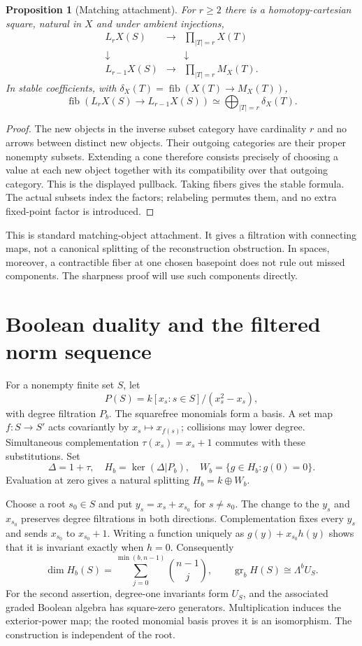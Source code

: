 \documentclass[11pt,a4paper]{article}
\newtheorem{proposition}[theorem]{Proposition}
\theoremstyle{definition}
\theoremstyle{remark}
\newcommand{\gr}{\operatorname{gr}}
\DeclareMathOperator{\fib}{fib}
\begin{document}
\begin{proposition}[Matching attachment]\label{prop:tower}
For $r\ge2$ there is a homotopy-cartesian square, natural in $X$ and under ambient injections,
\[
\begin{array}{ccc}
 L_rX(S)&\longrightarrow&\displaystyle\prod_{|T|=r}X(T)\\
 \downarrow&&\downarrow\\
 L_{r-1}X(S)&\longrightarrow&\displaystyle\prod_{|T|=r}M_X(T).
\end{array}
\]
In stable coefficients, with $\delta_X(T)=\fib(X(T)\to M_X(T))$,
\[
 \fib(L_rX(S)\to L_{r-1}X(S))\simeq\bigoplus_{|T|=r}\delta_X(T).
\]
\end{proposition}
\begin{proof}
The new objects in the inverse subset category have cardinality $r$ and no arrows between distinct new objects. Their outgoing categories are their proper nonempty subsets. Extending a cone therefore consists precisely of choosing a value at each new object together with its compatibility over that outgoing category. This is the displayed pullback. Taking fibers gives the stable formula. The actual subsets index the factors; relabeling permutes them, and no extra fixed-point factor is introduced.
\end{proof}

This is standard matching-object attachment. It gives a filtration with connecting maps, not a canonical splitting of the reconstruction obstruction. In spaces, moreover, a contractible fiber at one chosen basepoint does not rule out missed components. The sharpness proof will use such components directly.

\section{Boolean duality and the filtered norm sequence}

For a nonempty finite set $S$, let
\[
 P(S)=k[x_s:s\in S]/(x_s^2-x_s),
\]
with degree filtration $P_b$. The squarefree monomials form a basis. A set map $f:S\to S'$ acts covariantly by $x_s\mapsto x_{f(s)}$; collisions may lower degree. Simultaneous complementation $\tau(x_s)=x_s+1$ commutes with these substitutions. Set
\[
 \Delta=1+\tau,\quad H_b=\ker(\Delta|P_b),\quad
 W_b=\{g\in H_b:g(0)=0\}.
\]
Evaluation at zero gives a natural splitting $H_b=k\oplus W_b$.

Choose a root $s_0\in S$ and put $y_s=x_s+x_{s_0}$ for $s\ne s_0$. The change to the $y_s$ and $x_{s_0}$ preserves degree filtrations in both directions. Complementation fixes every $y_s$ and sends $x_{s_0}$ to $x_{s_0}+1$. Writing a function uniquely as $g(y)+x_{s_0}h(y)$ shows that it is invariant exactly when $h=0$. Consequently
\begin{equation}\label{eq:boolean-dim}
 \dim H_b(S)=\sum_{j=0}^{\min(b,n-1)}\binom{n-1}{j},
 \qquad \gr_b H(S)\cong\Lambda^b U_S.
\end{equation}
For the second assertion, degree-one invariants form $U_S$, and the associated graded Boolean algebra has square-zero generators. Multiplication induces the exterior-power map; the rooted monomial basis proves it is an isomorphism. The construction is independent of the root.
\end{document}
